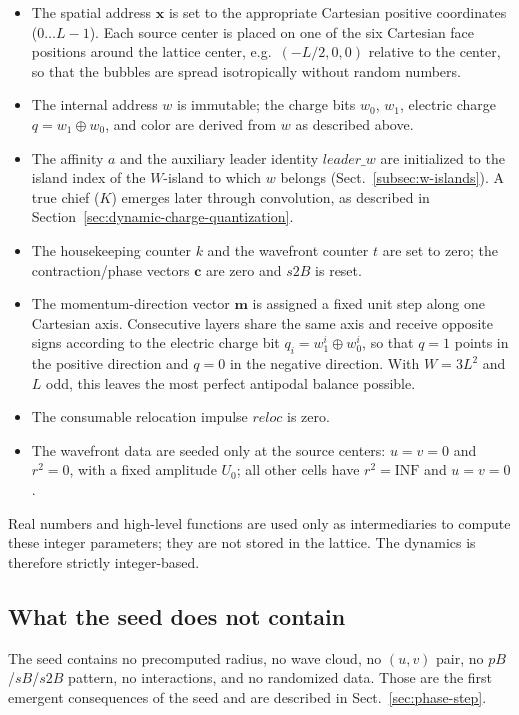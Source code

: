 \documentclass{ijuc}
\begin{document}
\begin{itemize}
  \item The spatial address $\boldsymbol{x}$ is set to the appropriate Cartesian positive coordinates ($0\ldots L-1$).  Each source center is placed on one of the six Cartesian face positions around the lattice center, e.g.~$(-L/2,0,0)$ relative to the center, so that the bubbles are spread isotropically without random numbers.
  \item The internal address $w$ is immutable; the charge bits $w_{0}$, $w_{1}$, electric charge $q=w_{1}\oplus w_{0}$, and color are derived from $w$ as described above.
  \item The affinity $a$ and the auxiliary leader identity $\mathit{leader\_w}$ are initialized to the island index of the $W$-island to which $w$ belongs (Sect.~\ref{subsec:w-islands}).  A true chief ($K$) emerges later through convolution, as described in Section~\ref{sec:dynamic-charge-quantization}.
  \item The housekeeping counter $k$ and the wavefront counter $t$ are set to zero; the contraction/phase vectors $\mathbf{c}$ are zero and $s2B$ is reset.
  \item The momentum-direction vector $\boldsymbol{m}$ is assigned a fixed unit step along one Cartesian axis.  Consecutive layers share the same axis and receive opposite signs according to the electric charge bit $q_{i}=w_{1}^{i}\oplus w_{0}^{i}$, so that $q=1$ points in the positive direction and $q=0$ in the negative direction.  With $W=3L^{2}$ and $L$ odd, this leaves the most perfect antipodal balance possible.
  \item The consumable relocation impulse $\mathit{reloc}$ is zero.
  \item The wavefront data are seeded only at the source centers: $u=v=0$ and $r^{2}=0$, with a fixed amplitude $U_{0}$; all other cells have $r^{2}=\mathrm{INF}$ and $u=v=0$.
\end{itemize}

Real numbers and high-level functions are used only as intermediaries to compute these integer parameters; they are not stored in the lattice.  The dynamics is therefore strictly integer-based.

\subsection{What the seed does not contain}

The seed contains no precomputed radius, no wave cloud, no $(u,v)$ pair, no $pB$/$sB$/$s2B$ pattern, no interactions, and no randomized data.  Those are the first emergent consequences of the seed and are described in Sect.~\ref{sec:phase-step}.
\end{document}
